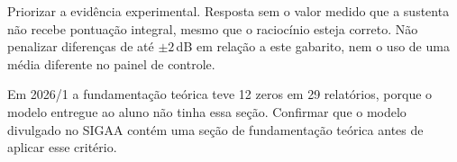 \documentclass[11pt,a4paper]{article}
\begin{document}
\begin{nota}
Priorizar a evidência experimental. Resposta sem o valor medido que a sustenta
não recebe pontuação integral, mesmo que o raciocínio esteja correto. Não
penalizar diferenças de até $\pm 2$\,dB em relação a este gabarito, nem o uso
de uma média diferente no painel de controle.

Em 2026/1 a fundamentação teórica teve 12 zeros em 29 relatórios, porque o
modelo entregue ao aluno não tinha essa seção. Confirmar que o modelo divulgado
no SIGAA contém uma seção de fundamentação teórica antes de aplicar esse
critério.
\end{nota}
\end{document}
